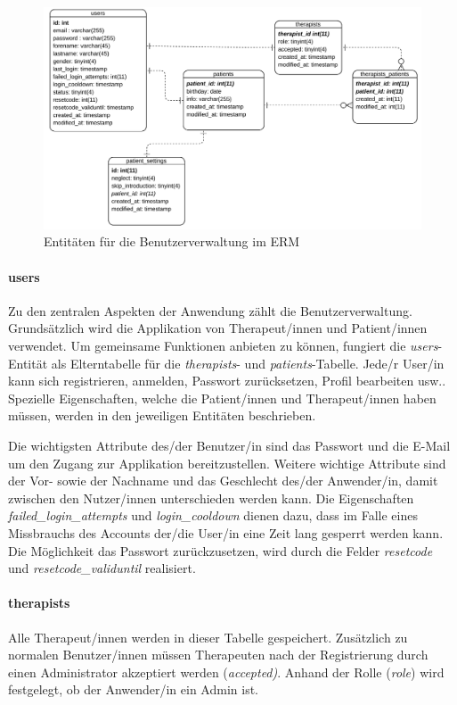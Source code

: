 \begin{figure}[H]
	\includegraphics[width=1\linewidth]{figures/development/planning/er/users.png}
	\caption{Entitäten für die Benutzerverwaltung im \acs{ERM}}
	\label{fig:er_users}
\end{figure}

\paragraph{users}
Zu den zentralen Aspekten der Anwendung zählt die Benutzerverwaltung. Grundsätzlich wird die Applikation von Therapeut/innen und Patient/innen verwendet. Um gemeinsame Funktionen anbieten zu können, fungiert die \textit{users}-Entität als Elterntabelle für die \textit{therapists}- und \textit{patients}-Tabelle. Jede/r User/in kann sich registrieren, anmelden, Passwort zurücksetzen, Profil bearbeiten \acl{usw.}. Spezielle Eigenschaften, welche die Patient/innen und Therapeut/innen haben müssen, werden in den jeweiligen Entitäten beschrieben.

Die wichtigsten Attribute des/der Benutzer/in sind das Passwort und die E-Mail um den Zugang zur Applikation bereitzustellen. Weitere wichtige Attribute sind der Vor- sowie der Nachname und das Geschlecht des/der Anwender/in, damit zwischen den Nutzer/innen unterschieden werden kann. Die Eigenschaften \textit{failed\_login\_attempts} und \textit{login\_cooldown} dienen dazu, dass im Falle eines Missbrauchs des Accounts der/die User/in eine Zeit lang gesperrt werden kann. Die Möglichkeit das Passwort zurückzusetzen, wird durch die Felder \textit{resetcode} und \textit{resetcode\_validuntil} realisiert.

\paragraph{therapists}
Alle Therapeut/innen werden in dieser Tabelle gespeichert. Zusätzlich zu normalen Benutzer/innen müssen Therapeuten nach der Registrierung durch einen Administrator akzeptiert werden (\textit{accepted)}. Anhand der Rolle (\textit{role}) wird festgelegt, ob der Anwender/in ein Admin ist.

